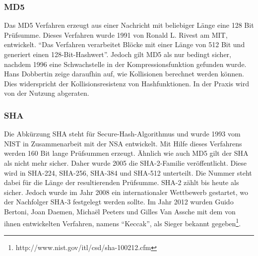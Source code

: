 \subsubsection{MD5}
\label{md5}
Das \ac{MD5} Verfahren erzeugt aus einer Nachricht mit beliebiger Länge eine 128 Bit Prüfsumme\cite[vgl.][Seite 130]{ling02}.
Dieses Verfahren wurde 1991 von Ronald L. Rivest am \ac{MIT}, entwickelt\cite[vgl.][]{md5}.
"`Das Verfahren verarbeitet Blöcke mit einer Länge von 512 Bit und generiert einen 128-Bit-Hashwert"'\cite[vgl.][Seite 130]{ling02}.
Jedoch gilt \ac{MD5} als nur bedingt sicher, nachdem 1996 eine Schwachstelle in der Kompressionsfunktion gefunden wurde\cite[vgl.][Seite 132]{ling02}.
Hans Dobbertin zeige daraufhin auf, wie Kollisionen berechnet werden können\cite[vgl.][Seite 132]{ling02}.
Dies widerspricht der Kollisionsresistenz von Hashfunktionen.
In der Praxis wird von der Nutzung abgeraten\cite[vgl.][Seite 132]{ling02}.

\subsubsection{SHA}
\label{sha}
Die Abkürzung SHA steht für Secure-Hash-Algorithmus und wurde 1993 vom \ac{NIST} in Zusammenarbeit mit der \ac{NSA} entwickelt\cite[vgl.][Seite 131]{ling02}.
Mit Hilfe dieses Verfahrens werden 160 Bit lange Prüfsummen erzeugt\cite[vgl.][Seite 131]{ling02}.
Ähnlich wie auch \ac{MD5} gilt der \ac{SHA} als nicht mehr sicher\cite[vgl.][Seite 132]{ling02}.
Daher wurde 2005 die SHA-2-Familie veröffentlicht.
Diese wird in SHA-224, SHA-256, SHA-384 und SHA-512 unterteilt.
Die Nummer steht dabei für die Länge der resultierenden Prüfsumme.
SHA-2 zählt bis heute als sicher.
Jedoch wurde im Jahr 2008 ein internationaler Wettbewerb gestartet, wo der Nachfolger SHA-3 festgelegt werden sollte.
Im Jahr 2012 wurden Guido Bertoni, Joan Daemen, Michaël Peeters und Gilles Van Assche mit dem von ihnen entwickelten Verfahren, namens "`Keccak"', als Sieger bekannt gegeben\footnote{http://www.nist.gov/itl/csd/sha-100212.cfm}.

